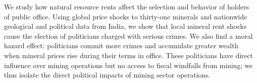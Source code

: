 We study how natural resource rents affect the selection and behavior
of holders of public office. Using global price shocks to thirty-one
minerals and nationwide geological and political data from India, we
show that local mineral rent shocks cause the election of politicians
charged with serious crimes.  We also find a moral hazard effect:
politicians commit more crimes and accumulate greater wealth when
mineral prices rise during their terms in office. These politicians
have direct influence over mining operations but no access to fiscal
windfalls from mining; we thus isolate the direct political impacts of
mining sector operations.



